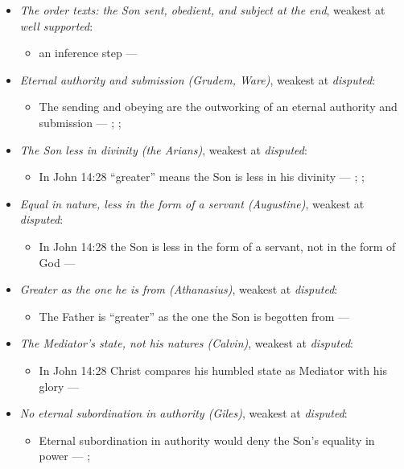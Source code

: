 \documentclass[11pt,paper=\testimonypaper,DIV=13,parskip=false]{scrartcl}
\begin{document}
\begin{itemize}
\item \emph{The order texts: the Son sent, obedient, and subject at the end}, weakest at \emph{well supported}:
\begin{itemize}
\item an inference step --- \cite[3, The Triune God]{kibbey-living-systematic-theology-2026}
\end{itemize}
\item \emph{Eternal authority and submission (Grudem, Ware)}, weakest at \emph{disputed}:
\begin{itemize}
\item The sending and obeying are the outworking of an eternal authority and submission --- \cite[40]{grudem-doctrinal-deviations-2015}; \cite{grudem-ets-trinity-2016}; \cite{ware-father-son-holy-spirit-2005}
\end{itemize}
\item \emph{The Son less in divinity (the Arians)}, weakest at \emph{disputed}:
\begin{itemize}
\item In John 14:28 “greater” means the Son is less in his divinity --- \cite[De Synodis 28]{schaff-nicene-post-nicene-fathers-2-4-1892}; \cite[On the Trinity I.7.14]{schaff-nicene-post-nicene-fathers-1-3-1887}; \cite[102]{calvin-commentary-john-2-1847}
\end{itemize}
\item \emph{Equal in nature, less in the form of a servant (Augustine)}, weakest at \emph{disputed}:
\begin{itemize}
\item In John 14:28 the Son is less in the form of a servant, not in the form of God --- \cite[On the Trinity I.7.14]{schaff-nicene-post-nicene-fathers-1-3-1887}
\end{itemize}
\item \emph{Greater as the one he is from (Athanasius)}, weakest at \emph{disputed}:
\begin{itemize}
\item The Father is “greater” as the one the Son is begotten from --- \cite[Against the Arians I.13.58]{schaff-nicene-post-nicene-fathers-2-4-1892}
\end{itemize}
\item \emph{The Mediator’s state, not his natures (Calvin)}, weakest at \emph{disputed}:
\begin{itemize}
\item In John 14:28 Christ compares his humbled state as Mediator with his glory --- \cite[102--103]{calvin-commentary-john-2-1847}
\end{itemize}
\item \emph{No eternal subordination in authority (Giles)}, weakest at \emph{disputed}:
\begin{itemize}
\item Eternal subordination in authority would deny the Son’s equality in power --- \cite[323]{giles-ets-trinity-2008}; \cite{giles-jesus-and-the-father-2006}
\end{itemize}
\end{itemize}
\end{document}
